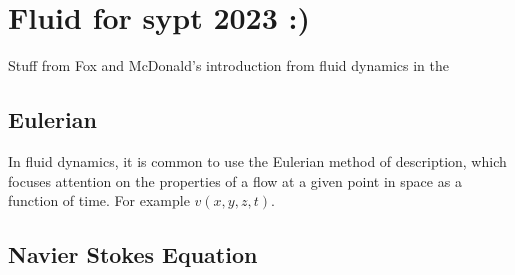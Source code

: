 \chapter{Fluid for sypt 2023 :)}
Stuff from Fox and McDonald's introduction from fluid dynamics in the
\section{Eulerian}
In fluid dynamics, it is common to use the Eulerian method of description, which focuses attention on the properties of a flow at a given point in space as a function of time. For example $v(x,y,z,t)$.

\section{Navier Stokes Equation}